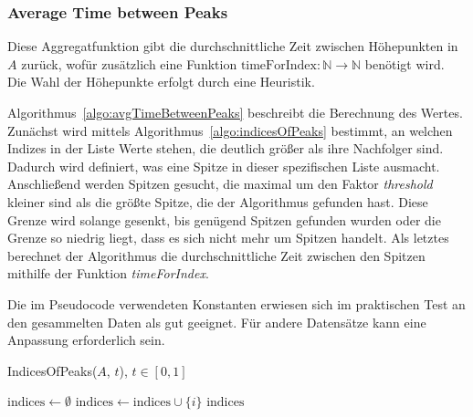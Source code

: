 \subsubsection{Average Time between Peaks}
Diese Aggregatfunktion gibt die durchschnittliche Zeit zwischen Höhepunkten in $A$ zurück, wofür zusätzlich eine Funktion $\text{timeForIndex}: \mathbb{N} \to \mathbb{N}$ benötigt wird. Die Wahl der Höhepunkte erfolgt durch eine Heuristik. 

Algorithmus~\ref{algo:avgTimeBetweenPeaks} beschreibt die Berechnung des Wertes. Zunächst wird mittels Algorithmus~\ref{algo:indicesOfPeaks} bestimmt, an welchen Indizes in der Liste Werte stehen, die deutlich größer als ihre Nachfolger sind. Dadurch wird definiert, was eine Spitze in dieser spezifischen Liste ausmacht. Anschließend werden Spitzen gesucht, die maximal um den Faktor \textit{threshold} kleiner sind als die größte Spitze, die der Algorithmus gefunden hast. Diese Grenze wird solange gesenkt, bis genügend Spitzen gefunden wurden oder die Grenze so niedrig liegt, dass es sich nicht mehr um Spitzen handelt. Als letztes berechnet der Algorithmus die durchschnittliche Zeit zwischen den Spitzen mithilfe der Funktion \textit{timeForIndex}.

Die im Pseudocode verwendeten Konstanten erwiesen sich im praktischen Test an den gesammelten Daten als gut geeignet. Für andere Datensätze kann eine Anpassung erforderlich sein.

\begin{algorithm}
    \caption{IndicesOfPeaks($A$, $t$), $t \in [0,1]$}
    \label{algo:indicesOfPeaks}
    \begin{algorithmic}
        \State $\text{indices} \gets \emptyset$
                \State $\text{indices} \gets \text{indices} \cup \{i\}$
            \EndIf
        \EndFor
        \State \Return $\text{indices}$
    \end{algorithmic}
\end{algorithm}

